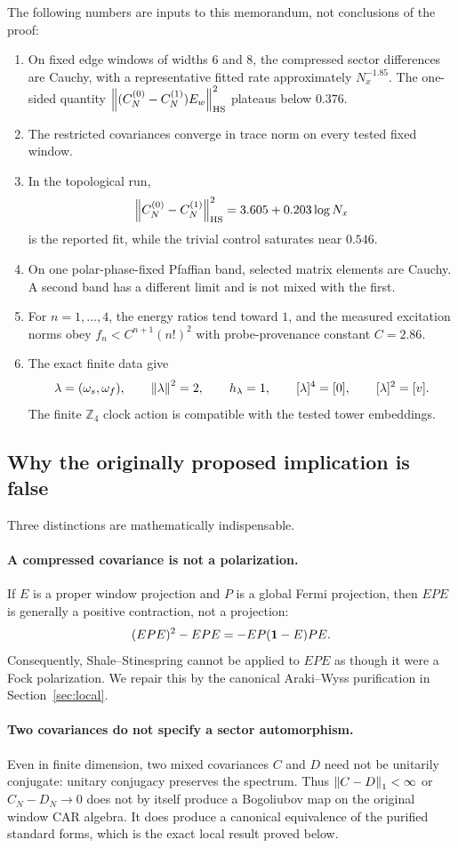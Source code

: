 The following numbers are inputs to this memorandum, not conclusions of
the proof:
\begin{enumerate}[label=(D\arabic*)]
\item On fixed edge windows of widths $6$ and $8$, the compressed
  sector differences are Cauchy, with a representative fitted rate
  approximately $N_x^{-1.85}$.  The one-sided quantity
  $\left\lVert (C_N^{(0)}-C_N^{(1)})E_w\right\rVert_{\mathrm{HS}}^2$ plateaus below $0.376$.
\item The restricted covariances converge in trace norm on every tested
  fixed window.
\item In the topological run,
  \[
  \left\lVert C_N^{(0)}-C_N^{(1)}\right\rVert_{\mathrm{HS}}^2
  =3.605+0.203\log N_x
  \]
  is the reported fit, while the trivial control saturates near $0.546$.
\item On one polar-phase-fixed Pfaffian band, selected matrix elements
  are Cauchy.  A second band has a different limit and is not mixed with
  the first.
\item For $n=1,\ldots,4$, the energy ratios tend toward $1$, and the
  measured excitation norms obey
  $f_n<C^{n+1}(n!)^2$ with probe-provenance constant $C=2.86$.
\item The exact finite data give
  \[
  \lambda=(\omega_s,\omega_f),\qquad
  \left\lVert \lambda\right\rVert^2=2,\qquad h_\lambda=1,\qquad
  [\lambda]^4=[0],\qquad [\lambda]^2=[v].
  \]
  The finite $\mathbb Z_4$ clock action is compatible with the tested
  tower embeddings.
\end{enumerate}

\subsection{Why the originally proposed implication is false}

Three distinctions are mathematically indispensable.

\paragraph{A compressed covariance is not a polarization.}
If $E$ is a proper window projection and $P$ is a global Fermi projection,
then $EPE$ is generally a positive contraction, not a projection:
\[
 (EPE)^2-EPE=-EP(\mathbf 1-E)PE.
\]
Consequently, Shale--Stinespring cannot be applied to $EPE$ as though it
were a Fock polarization.  We repair this by the canonical
Araki--Wyss purification in Section~\ref{sec:local}.

\paragraph{Two covariances do not specify a sector automorphism.}
Even in finite dimension, two mixed covariances $C$ and $D$ need not be
unitarily conjugate: unitary conjugacy preserves the spectrum.  Thus
$\left\lVert C-D\right\rVert_{1}<\infty$ or $C_N-D_N\to0$ does not by itself produce a
Bogoliubov map on the original window CAR algebra.  It does produce a
canonical equivalence of the purified standard forms, which is the exact
local result proved below.

